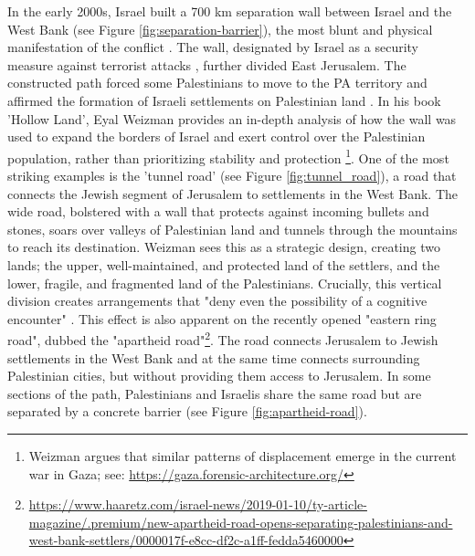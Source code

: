 \documentclass[dissertation,math,vertlayout,pdfa,colorlinks]{aaltoseries}
\begin{document}
In the early 2000s, Israel built a 700 km separation wall between Israel and the West Bank (see Figure \ref{fig:separation-barrier}), the most blunt and physical manifestation of the conflict \cite{weizmanHollowLandIsraels2012}. The wall, designated by Israel as a security measure against terrorist attacks \cite{sasleyEndOsloSecond2022}, further divided East Jerusalem. The constructed path forced some Palestinians to move to the PA territory and affirmed the formation of Israeli settlements on Palestinian land \cite{kleinJerusalem2022}. In his book 'Hollow Land', Eyal Weizman provides an in-depth analysis of how the wall was used to expand the borders of Israel and exert control over the Palestinian population, rather than prioritizing stability and protection \cite{weizmanHollowLandIsraels2012}\footnote{Weizman argues that similar patterns of displacement emerge in the current war in Gaza; see: \url{https://gaza.forensic-architecture.org/}}. One of the most striking examples is the 'tunnel road' \cite[p. 179]{weizmanHollowLandIsraels2012} (see Figure \ref{fig:tunnel_road}), a road that connects the Jewish segment of Jerusalem to settlements in the West Bank. The wide road, bolstered with a wall that protects against incoming bullets and stones, soars over valleys of Palestinian land and tunnels through the mountains to reach its destination. Weizman sees this as a strategic design, creating two lands; the upper, well-maintained, and protected land of the settlers, and the lower, fragile, and fragmented land of the Palestinians. Crucially, this vertical division creates arrangements that "deny even the possibility of a cognitive encounter" \cite[p. 181]{weizmanHollowLandIsraels2012}. This effect is also apparent on the recently opened "eastern ring road", dubbed the "apartheid road"\footnote{\url{https://www.haaretz.com/israel-news/2019-01-10/ty-article-magazine/.premium/new-apartheid-road-opens-separating-palestinians-and-west-bank-settlers/0000017f-e8cc-df2c-a1ff-fedda5460000}}. The road connects Jerusalem to Jewish settlements in the West Bank and at the same time connects surrounding Palestinian cities, but without providing them access to Jerusalem. In some sections of the path, Palestinians and Israelis share the same road but are separated by a concrete barrier (see Figure \ref{fig:apartheid-road}).
\end{document}
